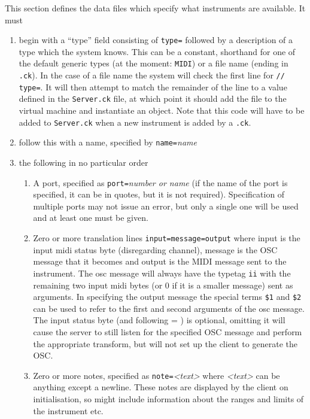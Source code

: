 \documentclass[../main.tex]{subfiles}
\begin{document}
This section defines the data files which specify what instruments are available. 
It must 
\begin{enumerate} [\bfseries 1.]
\item{begin with a ``type'' field consisting of \texttt{type=} followed by a description of a type which the system knows. This can be
a constant, shorthand for one of the default generic types (at the moment: \texttt{MIDI}) or a file name (ending in \texttt{.ck}). In the case of a file name
the system will check the first line for \texttt{// type=}. It will then attempt to match the remainder of the line to a value defined in the \texttt{Server.ck}
file, at which point it should add the file to the virtual machine and instantiate an object. Note that this code will have to be added to \texttt{Server.ck}
when a new instrument is added by a \texttt{.ck}.}
\item{follow this with a name, specified by \texttt{name=}\textit{name}}
\item{the following in no particular order}
	\begin{enumerate} [\bf a.]
		\item A port, specified as \texttt{port=}\textit{number or name} (if the name of the port is specified, it can be in quotes,
			 but it is not required). Specification of multiple ports may not issue an error, but only a single one will be used and at least one must be given.
		\item Zero or more translation lines \texttt{input=message=output} where input is the input midi
			 status byte (disregarding channel), message is the OSC message that it becomes and output is the MIDI message sent to the instrument.
	 		The osc message will always have the typetag \texttt{ii} with the remaining two input midi bytes (or 0 if it is a smaller message) sent as 
	 		arguments. In specifying the output message the special terms \texttt{\$1} and \texttt{\$2} can be used to refer to the first and second arguments
			 of the osc message. The input status byte (and following = ) is optional, omitting it will cause the server to still listen for the specified OSC
			 message and perform the appropriate transform, but will not set up the client to generate the OSC.
		\item Zero or more notes, specified as \texttt{note=}\textit{<text>} where \textit{<text>} can be anything except a newline. These notes are displayed by
			the client on initialisation, so might include information about the ranges and limits of the instrument etc.
	 \end{enumerate}
\end{enumerate}
\end{document}
